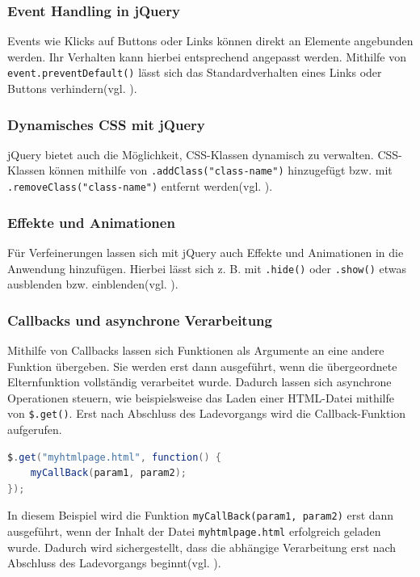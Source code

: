 \documentclass[oneside]{ausarbeitung}
\begin{document}
\subsubsection{Event Handling in jQuery}
Events wie Klicks auf Buttons oder Links können direkt an Elemente angebunden werden. Ihr Verhalten kann hierbei entsprechend angepasst werden. Mithilfe von  
\texttt{event.preventDefault()} lässt sich das Standardverhalten eines Links oder Buttons verhindern(vgl. \parencite{jquery_api}).  

\subsubsection{Dynamisches CSS mit jQuery}
jQuery bietet auch die Möglichkeit, CSS-Klassen dynamisch zu verwalten.  
CSS-Klassen können mithilfe von \texttt{.addClass("class-name")} hinzugefügt bzw. mit \texttt{.removeClass("class-name")} entfernt werden(vgl. \parencite{jquery_api}).  

\subsubsection{Effekte und Animationen}
Für Verfeinerungen lassen sich mit jQuery auch Effekte und Animationen in die Anwendung hinzufügen. Hierbei lässt sich z. B. mit \texttt{.hide()} oder \texttt{.show()} etwas ausblenden bzw. einblenden(vgl. \parencite{jquery_api}).  

\subsubsection{Callbacks und asynchrone Verarbeitung}
Mithilfe von Callbacks lassen sich Funktionen als Argumente an eine andere Funktion übergeben. Sie werden erst dann ausgeführt, wenn die übergeordnete Elternfunktion vollständig verarbeitet wurde. Dadurch lassen sich asynchrone Operationen steuern, wie beispielsweise das Laden einer HTML-Datei mithilfe von \texttt{\$.get()}. Erst nach Abschluss des Ladevorgangs wird die Callback-Funktion aufgerufen.  

\begin{lstlisting}[language=Java, caption={Verwendung eines Callbacks in jQuery}]
$.get("myhtmlpage.html", function() { 
    myCallBack(param1, param2); 
});
\end{lstlisting}

In diesem Beispiel wird die Funktion \texttt{myCallBack(param1, param2)} erst dann ausgeführt, wenn der Inhalt der Datei \texttt{myhtmlpage.html} erfolgreich geladen wurde. Dadurch wird sichergestellt, dass die abhängige Verarbeitung erst nach Abschluss des Ladevorgangs beginnt(vgl. \parencite{jquery_api}).  
\end{document}
